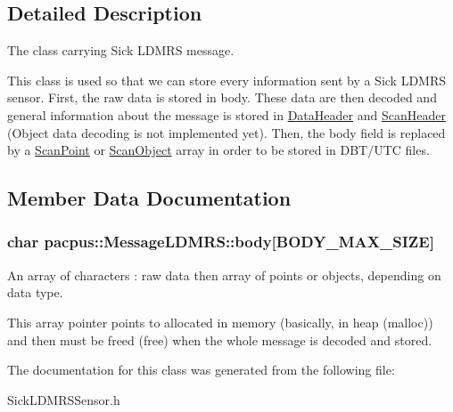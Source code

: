 \subsection{Detailed Description}
The class carrying Sick L\-D\-M\-R\-S message. 

This class is used so that we can store every information sent by a Sick L\-D\-M\-R\-S sensor. First, the raw data is stored in {\ttfamily body}. These data are then decoded and general information about the message is stored in \hyperlink{structpacpus_1_1DataHeader}{Data\-Header} and \hyperlink{structpacpus_1_1ScanHeader}{Scan\-Header} (Object data decoding is not implemented yet). Then, the body field is replaced by a \hyperlink{structpacpus_1_1ScanPoint}{Scan\-Point} or \hyperlink{structpacpus_1_1ScanObject}{Scan\-Object} array in order to be stored in D\-B\-T/\-U\-T\-C files. 

\subsection{Member Data Documentation}
\hypertarget{classpacpus_1_1MessageLDMRS_ad4f54e3688d2cca3f9175b9622dbed24}{
\subsubsection[{body}]{\setlength{\rightskip}{0pt plus 5cm}char pacpus\-::\-Message\-L\-D\-M\-R\-S\-::body\mbox{[}B\-O\-D\-Y\-\_\-\-M\-A\-X\-\_\-\-S\-I\-Z\-E\mbox{]}}}\label{classpacpus_1_1MessageLDMRS_ad4f54e3688d2cca3f9175b9622dbed24}


An array of characters \-: raw data then array of points or objects, depending on data type. 

This array pointer points to allocated in memory (basically, in heap (malloc)) and then must be freed (free) when the whole message is decoded and stored. 

The documentation for this class was generated from the following file\-:\begin{DoxyCompactItemize}
\item 
Sick\-L\-D\-M\-R\-S\-Sensor.\-h\end{DoxyCompactItemize}
